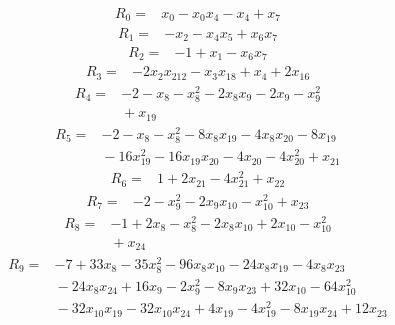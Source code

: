 {\small
\setlength{\jot}{2pt}
\allowdisplaybreaks[0]
\begin{align*}
R_{0} ={}& x_{0} - x_{0} x_{4} - x_{4} + x_{7}
\end{align*}
\begin{align*}
R_{1} ={}& -x_{2} - x_{4} x_{5} + x_{6} x_{7}
\end{align*}
\begin{align*}
R_{2} ={}& -1 + x_{1} - x_{6} x_{7}
\end{align*}
\begin{align*}
R_{3} ={}& -2x_{2} x_{212} - x_{3} x_{18} + x_{4} + 2x_{16}
\end{align*}
\begin{align*}
R_{4} ={}& -2 - x_{8} - x_{8}^{2} - 2x_{8} x_{9} - 2x_{9} - x_{9}^{2} \\
&{}  + x_{19}
\end{align*}
\begin{align*}
R_{5} ={}& -2 - x_{8} - x_{8}^{2} - 8x_{8} x_{19} - 4x_{8} x_{20} - 8x_{19} \\
&{}  - 16x_{19}^{2} - 16x_{19} x_{20} - 4x_{20} - 4x_{20}^{2} + x_{21}
\end{align*}
\begin{align*}
R_{6} ={}& 1 + 2x_{21} - 4x_{21}^{2} + x_{22}
\end{align*}
\begin{align*}
R_{7} ={}& -2 - x_{9}^{2} - 2x_{9} x_{10} - x_{10}^{2} + x_{23}
\end{align*}
\begin{align*}
R_{8} ={}& -1 + 2x_{8} - x_{8}^{2} - 2x_{8} x_{10} + 2x_{10} - x_{10}^{2} \\
&{}  + x_{24}
\end{align*}
\begin{align*}
R_{9} ={}& -7 + 33x_{8} - 35x_{8}^{2} - 96x_{8} x_{10} - 24x_{8} x_{19} - 4x_{8} x_{23} \\
&{}  - 24x_{8} x_{24} + 16x_{9} - 2x_{9}^{2} - 8x_{9} x_{23} + 32x_{10} - 64x_{10}^{2} \\
&{}  - 32x_{10} x_{19} - 32x_{10} x_{24} + 4x_{19} - 4x_{19}^{2} - 8x_{19} x_{24} + 12x_{23} \\

\end{align*}}
